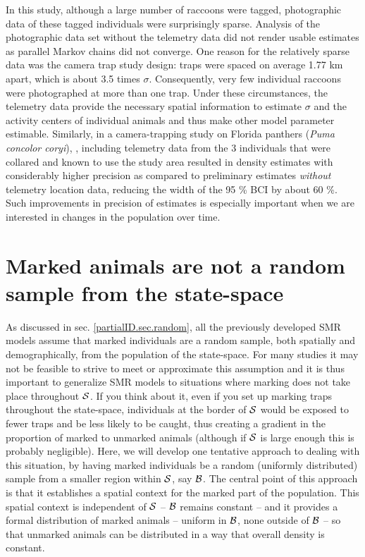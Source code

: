 In this study, although a large number of raccoons were tagged, photographic data of these tagged individuals were surprisingly sparse. Analysis of the photographic data set without the telemetry data did not render usable estimates as parallel Markov chains did not converge. One reason for the relatively sparse data was the camera trap study design: traps were spaced on average 1.77 km apart, which is about 3.5 times $\sigma$. Consequently, very few individual raccoons were photographed at more than one trap. Under these circumstances, the telemetry data provide the necessary spatial information to estimate $\sigma$ and the activity centers of individual animals and thus make other model parameter estimable. Similarly, in a camera-trapping study on Florida panthers (\emph{Puma concolor coryi}), \citet{sollmann_etal:inprepjapplecol}, including telemetry data from the 3 individuals that were collared and known to use the study area resulted in density estimates with considerably higher precision as compared to preliminary estimates \emph{without} telemetry location data, reducing the width of the 95 \% BCI by about 60 \%. Such improvements in precision of estimates is especially important when we are interested in changes in the population over time.


\section{Marked animals are not a random sample from the state-space}
As discussed in sec. \ref{partialID.sec.random}, all the previously developed SMR models assume that marked individuals are a random sample, both spatially and demographically, from the population of the state-space. For many studies it may not be feasible to strive to meet or approximate this assumption and it is thus important to generalize SMR models to situations where marking does not take place throughout ${\cal S}$. If you think about it, even if you set up marking traps throughout the state-space, individuals at the border of ${\cal S}$ would be exposed to fewer traps and be less likely to be caught, thus creating a gradient in the proportion of marked to unmarked animals (although if ${\cal S}$ is large enough this is probably negligible).
 Here, we will develop one tentative approach to dealing with this situation, by having marked individuals be a random (uniformly distributed) sample from a smaller region within ${\cal S}$, say ${\cal B}$.
The central point of this approach is that it establishes a spatial context for the marked part of the population. This spatial context is independent of ${\cal S}$ -- ${\cal B}$ remains constant -- and it provides a formal distribution of marked animals -- uniform in ${\cal B}$, none outside of ${\cal B}$ -- so that unmarked animals can be distributed in a way that overall density is constant.


